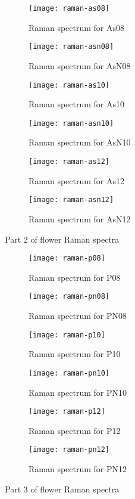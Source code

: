 \begin{figure*}[h]
\centering
\begin{subfigure}{8.25cm}\centering\texttt{[image: raman-as08]}\caption{Raman spectrum for As08}\end{subfigure}%
\begin{subfigure}{8.25cm}\centering\texttt{[image: raman-asn08]}\caption{Raman spectrum for AsN08}\end{subfigure}
\begin{subfigure}{8.25cm}\centering\texttt{[image: raman-as10]}\caption{Raman spectrum for As10}\end{subfigure}%
\begin{subfigure}{8.25cm}\centering\texttt{[image: raman-asn10]}\caption{Raman spectrum for AsN10}\end{subfigure}
\begin{subfigure}{8.25cm}\centering\texttt{[image: raman-as12]}\caption{Raman spectrum for As12}\end{subfigure}%
\begin{subfigure}{8.25cm}\centering\texttt{[image: raman-asn12]}\caption{Raman spectrum for AsN12}\end{subfigure}
\caption[Part 2 of flower Raman spectra]{Part 2 of flower Raman spectra}
\end{figure*}

\newpage

\begin{figure*}[h]
\centering
\begin{subfigure}{8.25cm}\centering\texttt{[image: raman-p08]}\caption{Raman spectrum for P08}\end{subfigure}%
\begin{subfigure}{8.25cm}\centering\texttt{[image: raman-pn08]}\caption{Raman spectrum for PN08}\end{subfigure}
\begin{subfigure}{8.25cm}\centering\texttt{[image: raman-p10]}\caption{Raman spectrum for P10}\end{subfigure}%
\begin{subfigure}{8.25cm}\centering\texttt{[image: raman-pn10]}\caption{Raman spectrum for PN10}\end{subfigure}
\begin{subfigure}{8.25cm}\centering\texttt{[image: raman-p12]}\caption{Raman spectrum for P12}\end{subfigure}%
\begin{subfigure}{8.25cm}\centering\texttt{[image: raman-pn12]}\caption{Raman spectrum for PN12}\end{subfigure}
\caption[Part 3 of flower Raman spectra]{Part 3 of flower Raman spectra}
\end{figure*}


